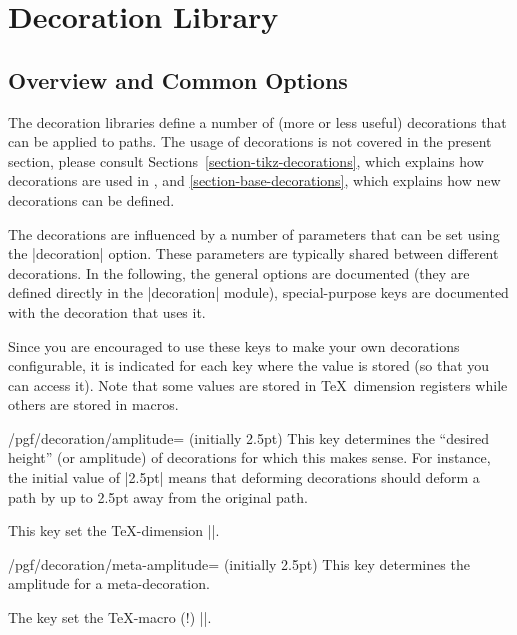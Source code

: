 %
%
%

\section{Decoration Library}
\label{section-library-decorations}



\subsection{Overview and Common Options}

The decoration libraries define a number of (more or less useful)
decorations that can be applied to paths. The usage of decorations is
not covered in the present section, please consult
Sections~\ref{section-tikz-decorations}, which explains how
decorations are used in \tikzname, and
\ref{section-base-decorations}, which  explains how new
decorations can be defined.

The decorations are influenced by a number of parameters that can be
set using the |decoration| option. These parameters are
typically shared between different decorations. In the following, the
general options are documented (they are defined directly in the
|decoration| module), special-purpose keys are documented
with the decoration that uses it.

Since you are encouraged to use these keys to make your own
decorations configurable, it is indicated for each key where the value
is stored (so that you can access it). Note that some values are
stored in \TeX\ dimension registers while others are stored in macros.

\begin{key}{/pgf/decoration/amplitude= (initially 2.5pt)}
  This key determines the ``desired height'' (or amplitude) of
  decorations for which this makes sense. For instance, the initial
  value of |2.5pt| means that deforming decorations should deform a
  path by up to 2.5pt away from the original path.

  This key set the \TeX-dimension |\pgfdecorationsegmentamplitude|.
\end{key}

\begin{key}{/pgf/decoration/meta-amplitude= (initially 2.5pt)}
  This key determines the amplitude for a meta-decoration.

  The key set the \TeX-macro (!) |\pgfmetadecorationsegmentamplitude|.
\end{key}


